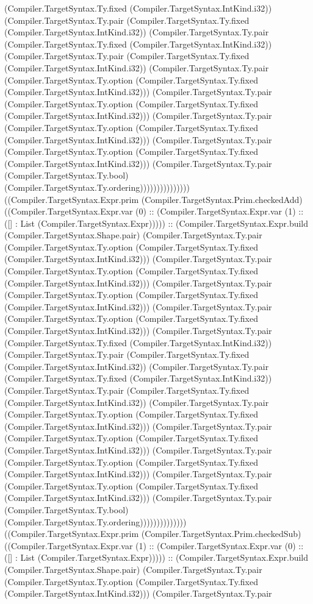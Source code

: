\documentclass[11pt]{article}
\begin{document}
(Compiler.TargetSyntax.Ty.fixed (Compiler.TargetSyntax.IntKind.i32)) (Compiler.TargetSyntax.Ty.pair (Compiler.TargetSyntax.Ty.fixed (Compiler.TargetSyntax.IntKind.i32)) (Compiler.TargetSyntax.Ty.pair (Compiler.TargetSyntax.Ty.fixed (Compiler.TargetSyntax.IntKind.i32)) (Compiler.TargetSyntax.Ty.pair (Compiler.TargetSyntax.Ty.fixed (Compiler.TargetSyntax.IntKind.i32)) (Compiler.TargetSyntax.Ty.pair (Compiler.TargetSyntax.Ty.option (Compiler.TargetSyntax.Ty.fixed (Compiler.TargetSyntax.IntKind.i32))) (Compiler.TargetSyntax.Ty.pair (Compiler.TargetSyntax.Ty.option (Compiler.TargetSyntax.Ty.fixed (Compiler.TargetSyntax.IntKind.i32))) (Compiler.TargetSyntax.Ty.pair (Compiler.TargetSyntax.Ty.option (Compiler.TargetSyntax.Ty.fixed (Compiler.TargetSyntax.IntKind.i32))) (Compiler.TargetSyntax.Ty.pair (Compiler.TargetSyntax.Ty.option (Compiler.TargetSyntax.Ty.fixed (Compiler.TargetSyntax.IntKind.i32))) (Compiler.TargetSyntax.Ty.pair (Compiler.TargetSyntax.Ty.bool) (Compiler.TargetSyntax.Ty.ordering))))))))))))))) ((Compiler.TargetSyntax.Expr.prim (Compiler.TargetSyntax.Prim.checkedAdd) ((Compiler.TargetSyntax.Expr.var (0) :: (Compiler.TargetSyntax.Expr.var (1) :: ([] : List (Compiler.TargetSyntax.Expr))))) :: (Compiler.TargetSyntax.Expr.build (Compiler.TargetSyntax.Shape.pair) (Compiler.TargetSyntax.Ty.pair (Compiler.TargetSyntax.Ty.option (Compiler.TargetSyntax.Ty.fixed (Compiler.TargetSyntax.IntKind.i32))) (Compiler.TargetSyntax.Ty.pair (Compiler.TargetSyntax.Ty.option (Compiler.TargetSyntax.Ty.fixed (Compiler.TargetSyntax.IntKind.i32))) (Compiler.TargetSyntax.Ty.pair (Compiler.TargetSyntax.Ty.option (Compiler.TargetSyntax.Ty.fixed (Compiler.TargetSyntax.IntKind.i32))) (Compiler.TargetSyntax.Ty.pair (Compiler.TargetSyntax.Ty.option (Compiler.TargetSyntax.Ty.fixed (Compiler.TargetSyntax.IntKind.i32))) (Compiler.TargetSyntax.Ty.pair (Compiler.TargetSyntax.Ty.fixed (Compiler.TargetSyntax.IntKind.i32)) (Compiler.TargetSyntax.Ty.pair (Compiler.TargetSyntax.Ty.fixed (Compiler.TargetSyntax.IntKind.i32)) (Compiler.TargetSyntax.Ty.pair (Compiler.TargetSyntax.Ty.fixed (Compiler.TargetSyntax.IntKind.i32)) (Compiler.TargetSyntax.Ty.pair (Compiler.TargetSyntax.Ty.fixed (Compiler.TargetSyntax.IntKind.i32)) (Compiler.TargetSyntax.Ty.pair (Compiler.TargetSyntax.Ty.option (Compiler.TargetSyntax.Ty.fixed (Compiler.TargetSyntax.IntKind.i32))) (Compiler.TargetSyntax.Ty.pair (Compiler.TargetSyntax.Ty.option (Compiler.TargetSyntax.Ty.fixed (Compiler.TargetSyntax.IntKind.i32))) (Compiler.TargetSyntax.Ty.pair (Compiler.TargetSyntax.Ty.option (Compiler.TargetSyntax.Ty.fixed (Compiler.TargetSyntax.IntKind.i32))) (Compiler.TargetSyntax.Ty.pair (Compiler.TargetSyntax.Ty.option (Compiler.TargetSyntax.Ty.fixed (Compiler.TargetSyntax.IntKind.i32))) (Compiler.TargetSyntax.Ty.pair (Compiler.TargetSyntax.Ty.bool) (Compiler.TargetSyntax.Ty.ordering)))))))))))))) ((Compiler.TargetSyntax.Expr.prim (Compiler.TargetSyntax.Prim.checkedSub) ((Compiler.TargetSyntax.Expr.var (1) :: (Compiler.TargetSyntax.Expr.var (0) :: ([] : List (Compiler.TargetSyntax.Expr))))) :: (Compiler.TargetSyntax.Expr.build (Compiler.TargetSyntax.Shape.pair) (Compiler.TargetSyntax.Ty.pair (Compiler.TargetSyntax.Ty.option (Compiler.TargetSyntax.Ty.fixed (Compiler.TargetSyntax.IntKind.i32))) (Compiler.TargetSyntax.Ty.pair 
\end{document}
